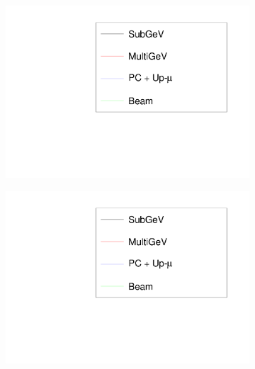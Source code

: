 \begin{figure}[h]
  \begin{subfigure}[t]{0.5\textwidth}
    \includegraphics[width=\textwidth, trim={0mm 0mm 0mm 0mm}, clip,page=4]{Figures/OA/LLHScans_Osc.pdf}
  \end{subfigure}%
  \begin{subfigure}[t]{0.5\textwidth}
    \includegraphics[width=\textwidth, trim={0mm 0mm 0mm 0mm}, clip,page=7]{Figures/OA/LLHScans_Osc.pdf}
  \end{subfigure}
  \begin{subfigure}[t]{0.5\textwidth}

\end{subfigure}
\end{figure}
